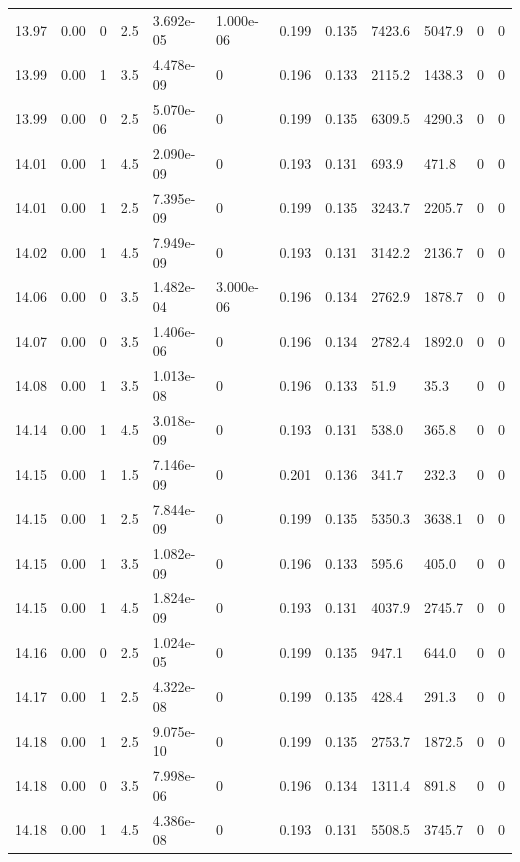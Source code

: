 \documentclass[preview]{standalone}
\begin{document}
{{{{{{{{{{{{{{\begin{tabular}{L{1.2cm}C{1.2cm} C{0.3cm}C{0.5cm} C{1.4cm}C{1.4cm} C{1.4cm}C{1.4cm} C{1.6cm}C{1.6cm} C{1.6cm}C{1.6cm}}
  13.97  &  0.00  & 0     & 2.5 &  3.692e-05  & 1.000e-06  &  0.199&   0.135& 7423.6 & 5047.9   &  0 & 0  \\ 
  13.99  &  0.00  & 1     & 3.5 &  4.478e-09  & 0  &  0.196&   0.133& 2115.2 & 1438.3   &  0 & 0  \\ 
  13.99  &  0.00  & 0     & 2.5 &  5.070e-06  & 0  &  0.199&   0.135& 6309.5 & 4290.3   &  0 & 0  \\ 
  14.01  &  0.00  & 1     & 4.5 &  2.090e-09  & 0  &  0.193&   0.131& 693.9 & 471.8   &  0 & 0  \\ 
  14.01  &  0.00  & 1     & 2.5 &  7.395e-09  & 0  &  0.199&   0.135& 3243.7 & 2205.7   &  0 & 0  \\ 
  14.02  &  0.00  & 1     & 4.5 &  7.949e-09  & 0  &  0.193&   0.131& 3142.2 & 2136.7   &  0 & 0  \\ 
  14.06  &  0.00  & 0     & 3.5 &  1.482e-04  & 3.000e-06  &  0.196&   0.134& 2762.9 & 1878.7   &  0 & 0  \\ 
  14.07  &  0.00  & 0     & 3.5 &  1.406e-06  & 0  &  0.196&   0.134& 2782.4 & 1892.0   &  0 & 0  \\ 
  14.08  &  0.00  & 1     & 3.5 &  1.013e-08  & 0  &  0.196&   0.133& 51.9 & 35.3   &  0 & 0  \\ 
  14.14  &  0.00  & 1     & 4.5 &  3.018e-09  & 0  &  0.193&   0.131& 538.0 & 365.8   &  0 & 0  \\ 
  14.15  &  0.00  & 1     & 1.5 &  7.146e-09  & 0  &  0.201&   0.136& 341.7 & 232.3   &  0 & 0  \\ 
  14.15  &  0.00  & 1     & 2.5 &  7.844e-09  & 0  &  0.199&   0.135& 5350.3 & 3638.1   &  0 & 0  \\ 
  14.15  &  0.00  & 1     & 3.5 &  1.082e-09  & 0  &  0.196&   0.133& 595.6 & 405.0   &  0 & 0  \\ 
  14.15  &  0.00  & 1     & 4.5 &  1.824e-09  & 0  &  0.193&   0.131& 4037.9 & 2745.7   &  0 & 0  \\ 
  14.16  &  0.00  & 0     & 2.5 &  1.024e-05  & 0  &  0.199&   0.135& 947.1 & 644.0   &  0 & 0  \\ 
  14.17  &  0.00  & 1     & 2.5 &  4.322e-08  & 0  &  0.199&   0.135& 428.4 & 291.3   &  0 & 0  \\ 
  14.18  &  0.00  & 1     & 2.5 &  9.075e-10  & 0  &  0.199&   0.135& 2753.7 & 1872.5   &  0 & 0  \\ 
  14.18  &  0.00  & 0     & 3.5 &  7.998e-06  & 0  &  0.196&   0.134& 1311.4 & 891.8   &  0 & 0  \\ 
  14.18  &  0.00  & 1     & 4.5 &  4.386e-08  & 0  &  0.193&   0.131& 5508.5 & 3745.7   &  0 & 0  \\ 

\end{tabular}}}}}}}}}}}}}}}
\end{document}
